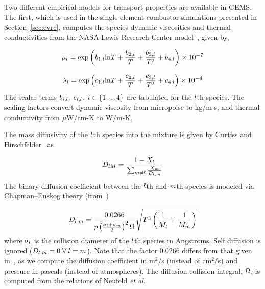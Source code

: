 Two different empirical models for transport properties are available in GEMS. The first, which is used in the single-element combustor simulations presented in Section~\ref{sec:cvrc}, computes the species dynamic viscosities and thermal conductivities from the NASA Lewis Research Center model~\cite{Svehla1995}, given by,

\begin{equation}
	\mu_{l} = \text{exp} \left(b_{1,l} \text{ln} T + \frac{b_{2,l}}{T} + \frac{b_{3,l}}{T^2} + b_{4,l} \right) \times 10^{-7}
\end{equation}

\begin{equation}
	\lambda_{l} = \text{exp} \left(c_{1,l} \text{ln} T + \frac{c_{2,l}}{T} + \frac{c_{3,l}}{T^2} + c_{4,l} \right) \times 10^{-4}
\end{equation}
The scalar terms $b_{i,l}, \; c_{i,l}$, $i \in \{1 \hdots 4\}$ are tabulated for the $l$th species. The scaling factors convert dynamic viscosity from micropoise to kg/m-s, and thermal conductivity from $\mu$W/cm-K to W/m-K.

The mass diffusivity of the $l$th species into the mixture is given by Curtiss and Hirschfelder~\cite{Curtiss1949} as

\begin{equation}\label{eq:curtissAvgDiff}
	D_{l M} = \frac{1 - X_{l}}{\sum_{m \neq l} \frac{X_{m}}{D_{l, m}}}
\end{equation}
The binary diffusion coefficient between the $l$th and $m$th species is modeled via Chapman--Enskog theory (from~\cite{propGasLiquid})

\begin{equation}
	D_{l, m} = \frac{0.0266}{p \left(\frac{\sigma_{l} + \sigma_{m}}{2}\right)^2 \Omega} \sqrt{T^3 \left(\frac{1}{M_{l}} + \frac{1}{M_{m}}\right)}
\end{equation}
where $\sigma_{l}$ is the collision diameter of the $l$th species in Angstroms. Self diffusion is ignored ($D_{l, m} = 0 \; \forall \; l = m$). Note that the factor 0.0266 differs from that given in~\cite{propGasLiquid}, as we compute the diffusion coefficient in m$^2$/s (instead of cm$^2$/s) and pressure in pascals (instead of atmospheres). The diffusion collision integral, $\Omega$, is computed from the relations of Neufeld \textit{et al.}~\cite{Neufeld1972}

